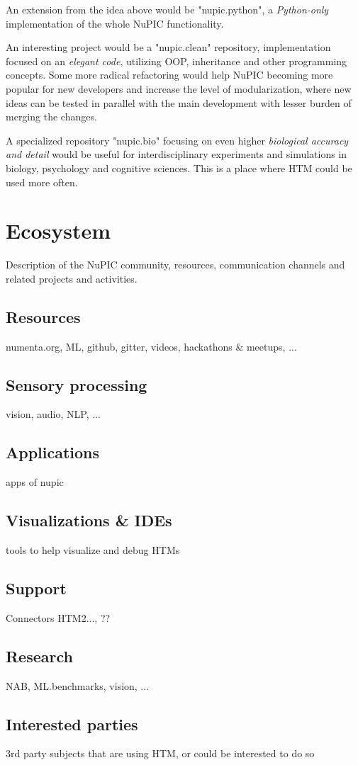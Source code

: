 \documentclass[a4,IEEEconf]{article}
\begin{document}
An extension from the idea above would be "nupic.python", a \textit{Python-only} implementation of the whole NuPIC functionality. 

An interesting project would be a "nupic.clean" repository, implementation focused on an \textit{elegant code}, utilizing OOP, inheritance and other programming concepts. Some more radical refactoring would help NuPIC becoming more popular for new developers and increase the level of modularization, where new ideas can be tested in parallel with the main development with lesser burden of merging the changes. 

A specialized repository "nupic.bio" focusing on even higher \textit{biological accuracy and detail} would be useful for interdisciplinary experiments and simulations in biology, psychology and cognitive sciences. This is a place where HTM could be used more often. 

\section{Ecosystem}
Description of the NuPIC community, resources, communication channels and related projects and activities. 
\subsection{Resources}
numenta.org, ML, github, gitter, videos, hackathons \& meetups, ...
\subsection{Sensory processing}
vision, audio, NLP, ...
\subsection{Applications}
apps of nupic
\subsection{Visualizations \& IDEs}
tools to help visualize and debug HTMs
\subsection{Support}
Connectors HTM2..., ??
\subsection{Research}
NAB, ML.benchmarks, vision, ...
\subsection{Interested parties}
3rd party subjects that are using HTM, or could be interested to do so
\end{document}
